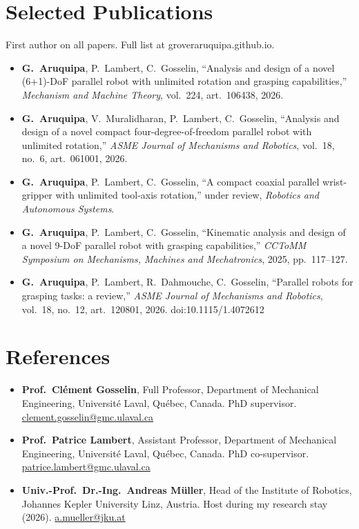 \documentclass[10pt,letterpaper]{article}
\begin{document}
\section{Selected Publications}
{\small First author on all papers. Full list at groveraruquipa.github.io.}\par\vspace{2pt}
\begin{itemize}
\item \textbf{G.~Aruquipa}, P.~Lambert, C.~Gosselin, ``Analysis and design of a novel (6+1)-DoF parallel robot with unlimited rotation and grasping capabilities,'' \emph{Mechanism and Machine Theory}, vol.~224, art.~106438, 2026.
\item \textbf{G.~Aruquipa}, V.~Muralidharan, P.~Lambert, C.~Gosselin, ``Analysis and design of a novel compact four-degree-of-freedom parallel robot with unlimited rotation,'' \emph{ASME Journal of Mechanisms and Robotics}, vol.~18, no.~6, art.~061001, 2026.
\item \textbf{G.~Aruquipa}, P.~Lambert, C.~Gosselin, ``A compact coaxial parallel wrist-gripper with unlimited tool-axis rotation,'' under review, \emph{Robotics and Autonomous Systems}.
\item \textbf{G.~Aruquipa}, P.~Lambert, C.~Gosselin, ``Kinematic analysis and design of a novel 9-DoF parallel robot with grasping capabilities,'' \emph{CCToMM Symposium on Mechanisms, Machines and Mechatronics}, 2025, pp.~117--127.
\item \textbf{G.~Aruquipa}, P.~Lambert, R.~Dahmouche, C.~Gosselin, ``Parallel robots for grasping tasks: a review,'' \emph{ASME Journal of Mechanisms and Robotics}, vol.~18, no.~12, art.~120801, 2026. doi:10.1115/1.4072612
\end{itemize}

\section{References}
\begin{itemize}
\item \textbf{Prof.~Cl\'ement Gosselin}, Full Professor, Department of Mechanical Engineering, Universit\'e Laval, Qu\'ebec,
Canada. PhD supervisor. \href{mailto:clement.gosselin@gmc.ulaval.ca}{clement.gosselin@gmc.ulaval.ca}
\item \textbf{Prof.~Patrice Lambert}, Assistant Professor, Department of Mechanical Engineering, Universit\'e Laval,
Qu\'ebec, Canada. PhD co-supervisor. \href{mailto:patrice.lambert@gmc.ulaval.ca}{patrice.lambert@gmc.ulaval.ca}
\item \textbf{Univ.-Prof.~Dr.-Ing.~Andreas M\"uller}, Head of the Institute of Robotics, Johannes Kepler University Linz,
Austria. Host during my research stay (2026). \href{mailto:a.mueller@jku.at}{a.mueller@jku.at}
\end{itemize}
\end{document}
